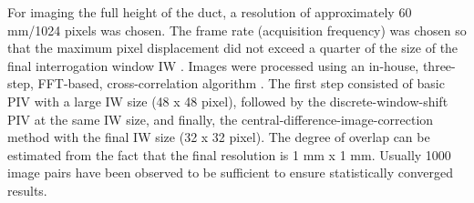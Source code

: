 \documentclass{jfm}
\begin{document}
For imaging the full height of the duct, a resolution of approximately 60 mm/1024 pixels was chosen. The frame rate (acquisition frequency) was chosen so that the maximum pixel displacement did not exceed a quarter of the size of the final interrogation window IW  \citep{raffel2013particle}. Images were processed using an in-house, three-step, FFT-based, cross-correlation algorithm  \cite[used in][]{kawata2014velocity}. The first step consisted of basic PIV with a large IW size (48 x 48 pixel), followed by the discrete-window-shift PIV at the same IW size, and finally, the central-difference-image-correction method \citep{wereley2003correlation} with the final IW size (32 x 32 pixel). The degree of overlap can be estimated from the fact that the final resolution is 1 mm x 1 mm. Usually 1000 image pairs have been observed to be sufficient to ensure statistically converged results.
\end{document}
